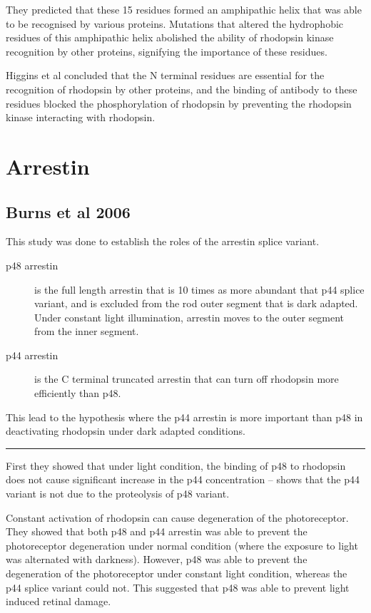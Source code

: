 \documentclass[a4paper,12pt]{article}
\begin{document}
They predicted that these 15 residues formed an amphipathic helix that was able to be recognised by various proteins.
Mutations that altered the hydrophobic residues of this amphipathic helix abolished the ability of rhodopsin kinase recognition by other proteins, signifying the importance of these residues.

Higgins et al concluded that the N terminal residues are essential for the recognition of rhodopsin by other proteins, and the binding of antibody to these residues blocked the phosphorylation of rhodopsin by preventing the rhodopsin kinase interacting with rhodopsin.

\section*{Arrestin}

\subsection*{Burns et al 2006}

This study was done to establish the roles of the arrestin splice variant.
\begin{description}
\item[p48 arrestin] is the full length arrestin that is 10 times as more abundant that p44 splice variant, and is excluded from the rod outer segment that is dark adapted.
Under constant light illumination, arrestin moves to the outer segment from the inner segment.
\item[p44 arrestin] is the C terminal truncated arrestin that can turn off rhodopsin more efficiently than p48.
\end{description}
This lead to the hypothesis where the p44 arrestin is more important than p48 in deactivating rhodopsin under dark adapted conditions.

\noindent\rule{\textwidth}{0.4pt}

First they showed that under light condition, the binding of p48 to rhodopsin does not cause significant increase in the p44 concentration -- shows that the p44 variant is not due to the proteolysis of p48 variant.

Constant activation of rhodopsin can cause degeneration of the photoreceptor.
They showed that both p48 and p44 arrestin was able to prevent the photoreceptor degeneration under normal condition (where the exposure to light was alternated with darkness).
However, p48 was able to prevent the degeneration of the photoreceptor under constant light condition, whereas the p44 splice variant could not.
This suggested that p48 was able to prevent light induced retinal damage.
\end{document}
